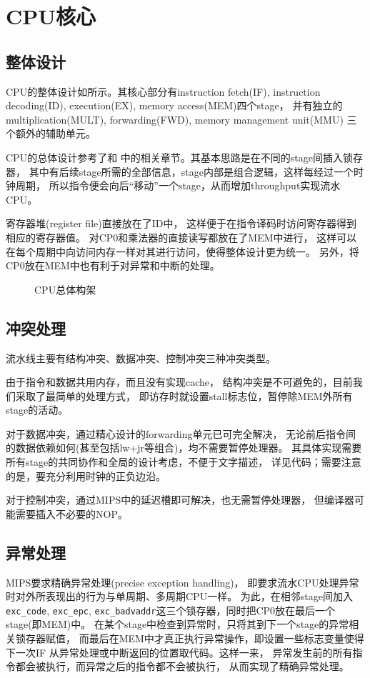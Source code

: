 
\section{CPU核心}
\subsection{整体设计}
CPU的整体设计如所示。其核心部分有instruction fetch(IF),
instruction decoding(ID), execution(EX), memory access(MEM)四个stage，
并有独立的multiplication(MULT), forwarding(FWD), memory management unit(MMU)
三个额外的辅助单元。

CPU的总体设计参考了\cite{bryant2008computer}和\cite{patterson2008computer}
中的相关章节。其基本思路是在不同的stage间插入锁存器，
其中有后续stage所需的全部信息，stage内部是组合逻辑，这样每经过一个时钟周期，
所以指令便会向后``移动''一个stage，从而增加throughput实现流水CPU。

寄存器堆(register file)直接放在了ID中，
这样便于在指令译码时访问寄存器得到相应的寄存器值。
对CP0和乘法器的直接读写都放在了MEM中进行，
这样可以在每个周期中向访问内存一样对其进行访问，使得整体设计更为统一。
另外，将CP0放在MEM中也有利于对异常和中断的处理。

\begin{figure}[!ht]
	\caption{\label{fig:cpuarch}CPU总体构架}
\end{figure}


\subsection{冲突处理}
流水线主要有结构冲突、数据冲突、控制冲突三种冲突类型。

由于指令和数据共用内存，而且没有实现cache，
结构冲突是不可避免的，目前我们采取了最简单的处理方式，
即访存时就设置stall标志位，暂停除MEM外所有stage的活动。

对于数据冲突，通过精心设计的forwarding单元已可完全解决，
无论前后指令间的数据依赖如何(甚至包括lw+jr等组合)，均不需要暂停处理器。
其具体实现需要所有stage的共同协作和全局的设计考虑，不便于文字描述，
详见代码；需要注意的是，要充分利用时钟的正负边沿。

对于控制冲突，通过MIPS中的延迟槽即可解决，也无需暂停处理器，
但编译器可能需要插入不必要的NOP。

\subsection{异常处理}
MIPS要求精确异常处理(precise exception handling)，
即要求流水CPU处理异常时对外所表现出的行为与单周期、多周期CPU一样。
为此，在相邻stage间加入\verb|exc_code|, \verb|exc_epc|,
\verb|exc_badvaddr|这三个锁存器，同时把CP0放在最后一个stage(即MEM)中。
在某个stage中检查到异常时，只将其到下一个stage的异常相关锁存器赋值，
而最后在MEM中才真正执行异常操作，即设置一些标志变量使得下一次IF
从异常处理或中断返回的位置取代码。这样一来，
异常发生前的所有指令都会被执行，而异常之后的指令都不会被执行，
从而实现了精确异常处理。

